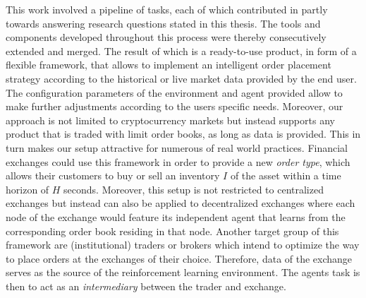 This work involved a pipeline of tasks, each of which contributed in partly towards answering research questions stated in this thesis.
The tools and components developed throughout this process were thereby consecutively extended and merged.
The result of which is a ready-to-use product, in form of a flexible framework, that allows to implement an intelligent order placement strategy according to the historical or live market data provided by the end user.
The configuration parameters of the environment and agent provided allow to make further adjustments according to the users specific needs.
Moreover, our approach is not limited to cryptocurrency markets but instead supports any product that is traded with limit order books, as long as data is provided.
This in turn makes our setup attractive for numerous of real world practices.
Financial exchanges could use this framework in order to provide a new \textit{order type}, which allows their customers to buy or sell an inventory $I$ of the asset within a time horizon of $H$ seconds.
Moreover, this setup is not restricted to centralized exchanges but instead can also be applied to decentralized exchanges where each node of the exchange would feature its independent agent that learns from the corresponding order book residing in that node.
Another target group of this framework are (institutional) traders or brokers which intend to optimize the way to place orders at the exchanges of their choice.
Therefore, data of the exchange serves as the source of the reinforcement learning environment. 
The agents task is then to act as an \textit{intermediary} between the trader and exchange.